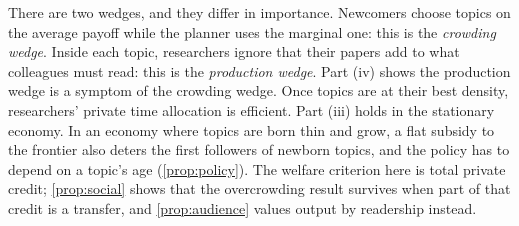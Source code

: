 There are two wedges, and they differ in importance. Newcomers choose topics
on the average payoff while the planner uses the marginal one: this is the
\emph{crowding wedge}. Inside each topic, researchers ignore that their papers
add to what colleagues must read: this is the \emph{production wedge}. Part
(iv) shows the production wedge is a symptom of the crowding wedge. Once topics
are at their best density, researchers' private time allocation is efficient.
Part (iii) holds in the stationary economy. In an economy where topics are born
thin and grow, a flat subsidy to the frontier also deters the first followers
of newborn topics, and the policy has to depend on a topic's age
(\cref{prop:policy}). The welfare criterion here is total private credit;
\cref{prop:social} shows that the overcrowding result survives when part of
that credit is a transfer, and \cref{prop:audience} values output by
readership instead.
